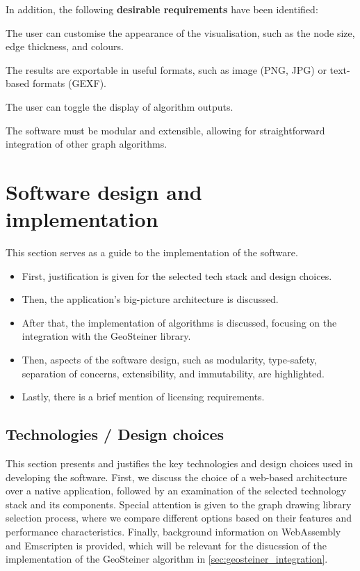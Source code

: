 \documentclass{l4proj}
\begin{document}
In addition, the following \textbf{desirable requirements} have been identified:
\begin{desirables}
    \item The user can customise the appearance of the visualisation, such as the node size, edge thickness, and colours.
    \item The results are exportable in useful formats, such as image (PNG, JPG) or text-based formats (GEXF).
    \item The user can toggle the display of algorithm outputs.
    \item The software must be modular and extensible, allowing for straightforward integration of other graph algorithms.
\end{desirables}

\chapter{Software design and implementation}
\label{sec:software_design_and_implementation}
This section serves as a guide to the implementation of the software.
\begin{itemize}
    \item First, justification is given for the selected tech stack and design choices.
    \item Then, the application's big-picture architecture is discussed.
    \item After that, the implementation of algorithms is discussed, focusing on the integration with the GeoSteiner library.
    \item Then, aspects of the software design, such as modularity, type-safety, separation of concerns, extensibility, and immutability, are highlighted.
    \item Lastly, there is a brief mention of licensing requirements.
\end{itemize}

\section{Technologies / Design choices}
This section presents and justifies the key technologies and design choices used in developing the software. First, we discuss the choice of a web-based architecture over a native application, followed by an examination of the selected technology stack and its components. Special attention is given to the graph drawing library selection process, where we compare different options based on their features and performance characteristics. Finally, background information on WebAssembly and Emscripten is provided, which will be relevant for the disucssion of the implementation of the GeoSteiner algorithm in \ref{sec:geosteiner_integration}.
\end{document}

